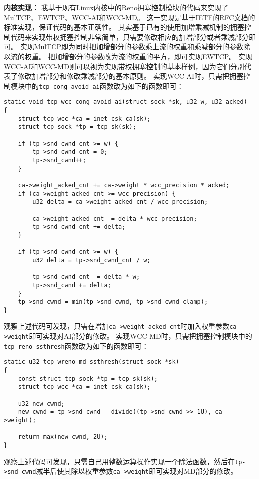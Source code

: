 \documentclass[winfonts]{njuthesis}
\begin{document}
\textbf{内核实现：}
我基于现有Linux内核中的Reno拥塞控制模块的代码来实现了MulTCP、EWTCP、WCC-AI和WCC-MD。
这一实现是基于IETF的RFC文档\cite{allman2009CC}的标准实现，保证代码的基本正确性。
其实基于已有的使用加增乘减机制的拥塞控制代码来实现带权拥塞控制非常简单，只需要修改相应的加增部分或者乘减部分即可。
实现MulTCP即为同时把加增部分的参数乘上流的权重和乘减部分的参数除以流的权重。
把加增部分的参数改为流的权重的平方，即可实现EWTCP。
实现WCC-AI和WCC-MD则可以视为实现带权拥塞控制的基本样例，因为它们分别代表了修改加增部分和修改乘减部分的基本原则。
实现WCC-AI时，只需把拥塞控制模块中的\texttt{tcp\_cong\_avoid\_ai}函数改为如下的函数即可：
\lstset{language=C,basicstyle=\footnotesize,frame=shadowbox}
\begin{lstlisting}
static void tcp_wcc_cong_avoid_ai(struct sock *sk, u32 w, u32 acked)
{
	struct tcp_wcc *ca = inet_csk_ca(sk);
	struct tcp_sock *tp = tcp_sk(sk);

	if (tp->snd_cwnd_cnt >= w) {
		tp->snd_cwnd_cnt = 0;
		tp->snd_cwnd++;
	}

	ca->weight_acked_cnt += ca->weight * wcc_precision * acked;
	if (ca->weight_acked_cnt >= wcc_precision) {
		u32 delta = ca->weight_acked_cnt / wcc_precision;

		ca->weight_acked_cnt -= delta * wcc_precision;
		tp->snd_cwnd_cnt += delta;
	}

	if (tp->snd_cwnd_cnt >= w) {
		u32 delta = tp->snd_cwnd_cnt / w;

		tp->snd_cwnd_cnt -= delta * w;
		tp->snd_cwnd += delta;
	}
	tp->snd_cwnd = min(tp->snd_cwnd, tp->snd_cwnd_clamp);
}
\end{lstlisting}
观察上述代码可发现，只需在增加\texttt{ca->weight\_acked\_cnt}时加入权重参数\texttt{ca->weight}即可实现对AI部分的修改。
实现WCC-MD时，只需把拥塞控制模块中的\texttt{tcp\_reno\_ssthresh}函数改为如下的函数即可：
\lstset{language=C,basicstyle=\footnotesize,frame=shadowbox}
\begin{lstlisting}
static u32 tcp_wreno_md_ssthresh(struct sock *sk)
{
    const struct tcp_sock *tp = tcp_sk(sk);
    struct tcp_wcc *ca = inet_csk_ca(sk);

    u32 new_cwnd;
    new_cwnd = tp->snd_cwnd - divide((tp->snd_cwnd >> 1U), ca->weight);

    return max(new_cwnd, 2U);
}
\end{lstlisting}
观察上述代码可发现，只需自己用整数运算操作实现一个除法函数，然后在\texttt{tp->snd\_cwnd}减半后使其除以权重参数\texttt{ca->weight}即可实现对MD部分的修改。
\end{document}
